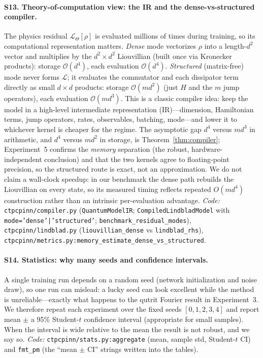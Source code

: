 \documentclass[11pt]{article}
\newcommand{\calL}{\mathcal{L}}
\newcommand{\calO}{\mathcal{O}}
\begin{document}
\paragraph{S13. Theory-of-computation view: the IR and the dense-vs-structured compiler.}
The physics residual $\calL_\Theta[\rho]$ is evaluated millions of times during training, so its computational representation matters. \emph{Dense} mode vectorizes $\rho$ into a length-$d^2$ vector and multiplies by the $d^2\times d^2$ Liouvillian (built once via Kronecker products): storage $\calO(d^4)$, each evaluation $\calO(d^4)$. \emph{Structured} (matrix-free) mode never forms $\calL$; it evaluates the commutator and each dissipator term directly as small $d\times d$ products: storage $\calO(m d^2)$ (just $H$ and the $m$ jump operators), each evaluation $\calO(m d^3)$. This is a classic compiler idea: keep the model in a high-level intermediate representation (IR)---dimension, Hamiltonian terms, jump operators, rates, observables, batching, mode---and lower it to whichever kernel is cheaper for the regime. The asymptotic gap $d^4$ versus $m d^3$ in arithmetic, and $d^4$ versus $m d^2$ in storage, is Theorem~\ref{thm:compiler}; Experiment~5 confirms the \emph{memory} separation (the robust, hardware-independent conclusion) and that the two kernels agree to floating-point precision, so the structured route is exact, not an approximation. We do not claim a wall-clock speedup: in our benchmark the dense path rebuilds the Liouvillian on every state, so its measured timing reflects repeated $O(md^4)$ construction rather than an intrinsic per-evaluation advantage. \emph{Code:} \texttt{ctpcpinn/compiler.py} (\texttt{QuantumModelIR}; \texttt{CompiledLindbladModel} with \texttt{mode='dense'|'structured'}; \texttt{benchmark\_residual\_modes}), \texttt{ctpcpinn/lindblad.py} (\texttt{liouvillian\_dense} vs \texttt{lindblad\_rhs}), \texttt{ctpcpinn/metrics.py:memory\_estimate\_dense\_vs\_structured}.

\paragraph{S14. Statistics: why many seeds and confidence intervals.}
A single training run depends on a random seed (network initialization and noise draw), so one run can mislead: a lucky seed can look excellent while the method is unreliable---exactly what happens to the qutrit Fourier result in Experiment~3. We therefore repeat each experiment over the fixed seeds $[0,1,2,3,4]$ and report mean $\pm$ a 95\% Student-$t$ confidence interval (appropriate for small samples). When the interval is wide relative to the mean the result is not robust, and we say so. \emph{Code:} \texttt{ctpcpinn/stats.py:aggregate} (mean, sample std, Student-$t$ CI) and \texttt{fmt\_pm} (the ``mean $\pm$ CI'' strings written into the tables).
\end{document}
